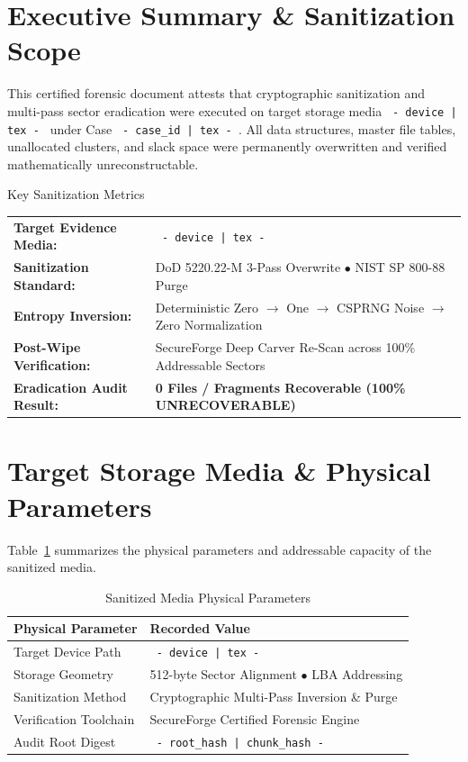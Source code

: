 \documentclass[12pt]{article}
\begin{document}
\clearpage
\tableofcontents
\clearpage


\section{Executive Summary \& Sanitization Scope}

This certified forensic document attests that cryptographic sanitization and multi-pass sector eradication were executed on target storage media \texttt{ {{- device | tex -}} } under Case \texttt{ {{- case_id | tex -}} }. All data structures, master file tables, unallocated clusters, and slack space were permanently overwritten and verified mathematically unreconstructable.

\vspace{0.3cm}
\begin{infocard}{Key Sanitization Metrics}
\noindent
\begin{tabularx}{\textwidth}{lX}
\textbf{Target Evidence Media:} & \texttt{ {{- device | tex -}} } \tabularnewline
\textbf{Sanitization Standard:} & DoD 5220.22-M 3-Pass Overwrite $\bullet$ NIST SP 800-88 Purge \tabularnewline
\textbf{Entropy Inversion:} & Deterministic Zero $\rightarrow$ One $\rightarrow$ CSPRNG Noise $\rightarrow$ Zero Normalization \tabularnewline
\textbf{Post-Wipe Verification:} & SecureForge Deep Carver Re-Scan across 100\% Addressable Sectors \tabularnewline
\textbf{Eradication Audit Result:} & \textcolor{brandsecondary}{\textbf{0 Files / Fragments Recoverable (100\% UNRECOVERABLE)}} \tabularnewline
\end{tabularx}
\end{infocard}

\section{Target Storage Media \& Physical Parameters}

Table~\ref{tab:device_specs} summarizes the physical parameters and addressable capacity of the sanitized media.

\begin{table}[H]
\centering
\caption{Sanitized Media Physical Parameters}
\label{tab:device_specs}
\noindent
\begin{tabularx}{\textwidth}{lX}
\toprule
\textbf{Physical Parameter} & \textbf{Recorded Value} \tabularnewline
\midrule
Target Device Path & \texttt{ {{- device | tex -}} } \tabularnewline
Storage Geometry & 512-byte Sector Alignment $\bullet$ LBA Addressing \tabularnewline
Sanitization Method & Cryptographic Multi-Pass Inversion \& Purge \tabularnewline
Verification Toolchain & SecureForge Certified Forensic Engine \tabularnewline
Audit Root Digest & {\small\texttt{ {{- root_hash | chunk_hash -}} }} \tabularnewline
\bottomrule
\end{tabularx}
\end{table}
\end{document}
